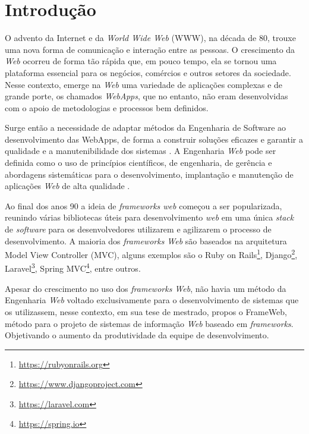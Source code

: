 \chapter{Introdução}
\label{sec-intro}

O advento da Internet e da \textit{World Wide Web} (WWW), na década de 80, trouxe uma nova
forma de comunicação e interação entre as pessoas. O crescimento da \textit{Web} ocorreu de forma tão
rápida que, em pouco tempo, ela se tornou uma plataforma essencial para os negócios, comércios
e outros setores da sociedade. Nesse contexto, emerge na \textit{Web} uma variedade de aplicações
complexas e de grande porte, os chamados \textit{WebApps}, que no entanto, não eram desenvolvidas com o apoio de
metodologias e processos bem definidos.

Surge então a necessidade de adaptar métodos da Engenharia de Software ao desenvolvimento
das WebApps, de forma a construir soluções eficazes e garantir a qualidade e a manutenibilidade 
dos sistemas \cite{beder:2017}. A Engenharia \textit{Web} pode ser definida como o uso de 
princípios científicos, de engenharia, de gerência e abordagens sistemáticas para o desenvolvimento,
implantação e manutenção de aplicações \textit{Web} de alta qualidade \cite{murugesan:2001}.

Ao final dos anos 90 a ideia de \textit{frameworks web} começou a ser popularizada, reunindo 
várias bibliotecas úteis para desenvolvimento \textit{web} em uma única \textit{stack} de \textit{software}
para os desenvolvedores utilizarem e agilizarem o processo de desenvolvimento. A maioria dos
\textit{frameworks Web} são baseados na arquitetura Model View Controller (MVC), alguns exemplos
são o Ruby on Rails\footnote{\url{https://rubyonrails.org}}, Django\footnote{\url{https://www.djangoproject.com}}, 
Laravel\footnote{\url{https://laravel.com}}, Spring MVC\footnote{\url{https://spring.io}}, entre outros.

Apesar do crescimento no uso dos \textit{frameworks Web}, não havia um método da Engenharia \textit{Web} 
voltado exclusivamente para o desenvolvimento de sistemas que os utilizassem, nesse contexto, em sua 
tese de mestrado,  propos o FrameWeb, método para o projeto de sistemas de 
informação \textit{Web} baseado em \textit{frameworks}. Objetivando o aumento da produtividade da 
equipe de desenvolvimento.

